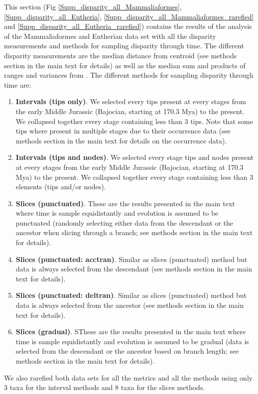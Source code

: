 \newpage
This section (Fig \ref{Supp_disparity_all_Mammaliaformes}, \ref{Supp_disparity_all_Eutheria}, \ref{Supp_disparity_all_Mammaliaformes_rarefied} and \ref{Supp_disparity_all_Eutheria_rarefied}) contains the results of the analysis of the Mammaliaformes and Eutherian data set with all the disparity measurements and methods for sampling disparity through time.
The different disparity measurements are the median distance from centroid (see methods section in the main text for details) as well as the median sum and products of ranges and variances from \cite{Wills1994}.
The different methods for sampling disparity through time are:
\begin{enumerate}
\item \textbf{Intervals (tips only)}. We selected every tips present at every stages from the early Middle Jurassic (Bajocian, starting at 170.3 Mya) to the present. We collapsed together every stage containing less than 3 tips. Note that some tips where present in multiple stages due to their occurrence data (see methods section in the main text for details on the occurrence data).
\item \textbf{Intervals (tips and nodes)}. We selected every stage tips and nodes present at every stages from the early Middle Jurassic (Bajocian, starting at 170.3 Mya) to the present. We collapsed together every stage containing less than 3 elements (tips and/or nodes).
\item \textbf{Slices (punctuated)}. These are the results presented in the main text where time is sample equidistantly and evolution is assumed to be punctuated (randomly selecting either data from the descendant or the ancestor when slicing through a branch; see methods section in the main text for details).
\item \textbf{Slices (punctuated: acctran)}. Similar as slices (punctuated) method but data is always selected from the descendant (see methods section in the main text for details).
\item \textbf{Slices (punctuated: deltran)}. Similar as slices (punctuated) method but data is always selected from the ancestor (see methods section in the main text for details).
\item \textbf{Slices (gradual)}. SThese are the results presented in the main text where time is sample equidistantly and evolution is assumed to be gradual (data is selected from the descendant or the ancestor based on branch length; see methods section in the main text for details).
\end{enumerate}
We also rarefied both data sets for all the metrics and all the methods using only 3 taxa for the interval methods and 8 taxa for the slices methods.


